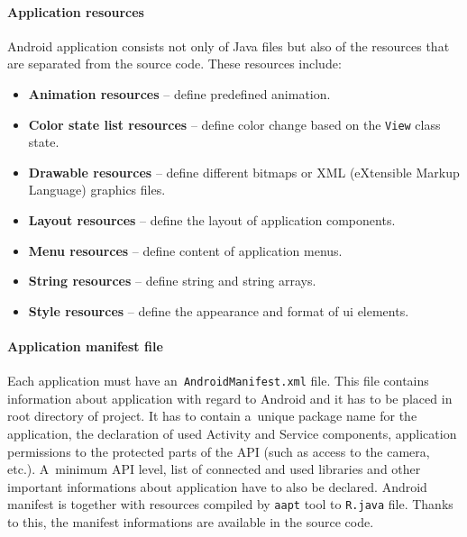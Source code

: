 \paragraph{Application resources}
Android application consists not only of Java files but also of the resources that are separated from the source code.
These resources include:

\begin{itemize}
    \item \textbf{Animation resources} -- define predefined animation.
    \item \textbf{Color state list resources} -- define color change based on the \texttt{View} class state.
    \item \textbf{Drawable resources} -- define different bitmaps or XML (eXtensible Markup Language) graphics files.
    \item \textbf{Layout resources} -- define the layout of application components.
    \item \textbf{Menu resources} -- define content of application menus.
    \item \textbf{String resources} -- define string and string arrays.
    \item \textbf{Style resources} -- define the appearance and format of ui elements.
\end{itemize}

\paragraph{Application manifest file}
Each application must have an~\texttt{AndroidManifest.xml} file. This file contains information about application with
regard to Android and it has to be placed in root directory of project. It has to contain a~unique package name for the
application, the declaration of used Activity and Service components, application permissions to the protected parts of
the API (such as access to the camera, etc.). A~minimum API level, list of connected and used libraries and other
important informations about application have to also be declared. Android manifest is together with resources compiled
by \texttt{aapt} tool to \texttt{R.java} file. Thanks to this, the manifest informations are available in the source
code.

